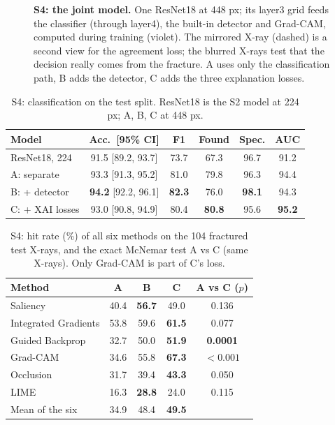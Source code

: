 \documentclass[conference]{IEEEtran}
\begin{document}
\begin{figure}[t]
{}
\caption{\textbf{S4: the joint model.} One ResNet18 at 448 px; its layer3 grid feeds the classifier (through layer4),
the built-in detector and Grad-CAM, computed during training (violet). The mirrored X-ray (dashed) is a second view for
the agreement loss; the blurred X-rays test that the decision really comes from the fracture. A uses only the
classification path, B adds the detector, C adds the three explanation losses.}
\label{fig:joint}
\end{figure}

\begin{table}[t]
\centering
\caption{S4: classification on the test split. ResNet18 is the S2 model at 224 px; A, B, C at 448 px.}
\label{tab:joint}
\renewcommand{\arraystretch}{1.1}
\setlength{\tabcolsep}{3pt}
\begin{tabular}{lccccc}
\toprule
Model & Acc.\ [95\% CI] & F1 & Found & Spec. & AUC \\
\midrule
ResNet18, 224  & 91.5 [89.2, 93.7] & 73.7 & 67.3 & 96.7 & 91.2 \\
A: separate    & 93.3 [91.3, 95.2] & 81.0 & 79.8 & 96.3 & 94.4 \\
B: + detector  & \textbf{94.2} [92.2, 96.1] & \textbf{82.3} & 76.0 & \textbf{98.1} & 94.3 \\
C: + XAI losses & 93.0 [90.8, 94.9] & 80.4 & \textbf{80.8} & 95.6 & \textbf{95.2} \\
\bottomrule
\end{tabular}
\end{table}

\begin{table}[t]
\centering
\caption{S4: hit rate (\%) of all six methods on the 104 fractured test X-rays, and the exact McNemar test A vs C
(same X-rays). Only Grad-CAM is part of C's loss.}
\label{tab:jointhits}
\renewcommand{\arraystretch}{1.1}
\setlength{\tabcolsep}{4pt}
\begin{tabular}{lcccc}
\toprule
Method & A & B & C & A vs C ($p$) \\
\midrule
Saliency             & 40.4 & \textbf{56.7} & 49.0 & 0.136 \\
Integrated Gradients & 53.8 & 59.6 & \textbf{61.5} & 0.077 \\
Guided Backprop      & 32.7 & 50.0 & \textbf{51.9} & \textbf{0.0001} \\
Grad-CAM             & 34.6 & 55.8 & \textbf{67.3} & $\mathbf{<0.001}$ \\
Occlusion            & 31.7 & 39.4 & \textbf{43.3} & 0.050 \\
LIME                 & 16.3 & \textbf{28.8} & 24.0 & 0.115 \\
\midrule
Mean of the six      & 34.9 & 48.4 & \textbf{49.5} & \\
\bottomrule
\end{tabular}
\end{table}
\end{document}
